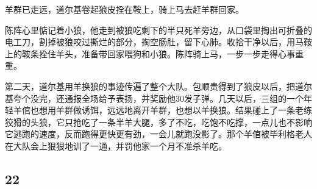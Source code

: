 \par 羊群已走远，道尔基卷起狼皮拴在鞍上，骑上马去赶羊群回家。
\par 陈阵心里惦记着小狼，他走到被狼吃剩下的半只死羊旁边，从口袋里掏出可折叠的电工刀，割掉被狼咬过撕烂的部分，掏空肠肚，留下心肺。收拾干净以后，用马鞍上的鞍条拴住羊头，准备带回家喂狗和小狼。陈阵骑上马，一步一步走得心事重重。
\par 第二天，道尔基用羊换狼的事迹传遍了整个大队。包顺贵得到了狼皮以后，把道尔基夸个没完，还通报全场给予表扬，并奖励他30发子弹。几天以后，三组的一个年轻羊倌也想用羊群做诱饵，远远地离开羊群，也想以羊换狼。结果碰上了一条老练狡猾的头狼，它只抢吃了一条半羊大腿，多了不吃，吃饱不吃撑，一点儿也不影响它逃跑的速度，反而跑得更快更有劲，一会儿就跑没影了。那个羊倌被毕利格老人在大队会上狠狠地训了一通，并罚他家一个月不准杀羊吃。
    


\subsection*{22}



